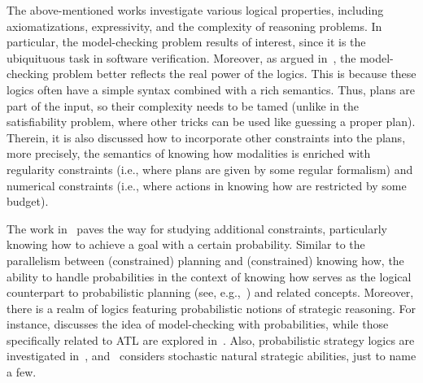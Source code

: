 The above-mentioned works investigate various logical properties, including axiomatizations, expressivity, and the complexity of reasoning problems. In particular, the model-checking problem results of interest, since it is the ubiquituous task in software verification. Moreover, as argued in~\cite{DemriF23}, the model-checking problem better reflects the real power of the logics. This is because these logics often have a simple syntax combined with a rich semantics. Thus, plans are part of the input, so their complexity needs to be tamed (unlike in the satisfiability problem, where other tricks can be used like guessing a proper plan). Therein, it is also discussed how to incorporate other constraints into the plans, more precisely, the semantics of knowing how modalities is enriched with regularity constraints (i.e., where plans are given by some regular formalism) and numerical constraints (i.e., where actions in knowing how are restricted by some budget). 

The work in \cite{DemriF23}~paves the way for studying additional constraints, particularly knowing how to achieve a goal with a certain probability. Similar to the parallelism between (constrained) planning and (constrained) knowing how, the ability to handle probabilities in the context of knowing how serves as the logical counterpart to probabilistic planning (see, e.g.,~\cite{MadaniHC99}) and related concepts. Moreover, there is a realm of logics featuring probabilistic notions of strategic reasoning. For instance, \cite{BaierAFK18} discusses the idea of model-checking with probabilities, while those specifically related to ATL are explored in~\cite{BA95,TJ07,BullingJ09}. Also, probabilistic strategy logics are investigated in~\cite{AKMM19}, and~\cite{BerthonKMM24} considers stochastic natural strategic abilities, just to name a few.

